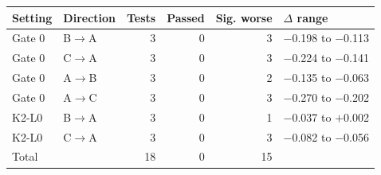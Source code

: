 \begin{tabular}{llrrrl}
\hline
Setting & Direction & Tests & Passed & Sig. worse & $\Delta$ range \\
\hline
Gate 0 & B$\to$A & 3 & 0 & 3 & $-$0.198 to $-$0.113 \\
Gate 0 & C$\to$A & 3 & 0 & 3 & $-$0.224 to $-$0.141 \\
Gate 0 & A$\to$B & 3 & 0 & 2 & $-$0.135 to $-$0.063 \\
Gate 0 & A$\to$C & 3 & 0 & 3 & $-$0.270 to $-$0.202 \\
K2-L0 & B$\to$A & 3 & 0 & 1 & $-$0.037 to $+$0.002 \\
K2-L0 & C$\to$A & 3 & 0 & 3 & $-$0.082 to $-$0.056 \\
Total & & 18 & 0 & 15 &  \\
\hline
\end{tabular}

